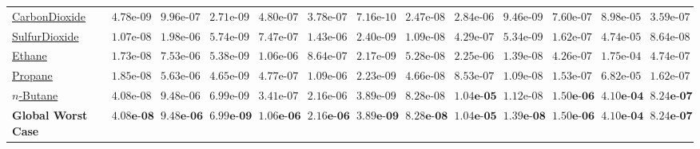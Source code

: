 \documentclass[10pt,a4paper]{article}
\begin{document}
\begin{table}[ht!]
{\begin{tabular}{lrrrrrrrrrrrr}
\href{https://github.com/satwikgupta122/realgas_ml/blob/main/realgas_ml/data/CarbonDioxide_metrics.json}{CarbonDioxide} & $4.78\text{e-}09$ & $9.96\text{e-}07$ & $2.71\text{e-}09$ & $4.80\text{e-}07$ & $3.78\text{e-}07$ & $7.16\text{e-}10$ & $2.47\text{e-}08$ & $2.84\text{e-}06$ & $9.46\text{e-}09$ & $7.60\text{e-}07$ & $8.98\text{e-}05$ & $3.59\text{e-}07$ \\
\href{https://github.com/satwikgupta122/realgas_ml/blob/main/realgas_ml/data/SulfurDioxide_metrics.json}{SulfurDioxide} & $1.07\text{e-}08$ & $1.98\text{e-}06$ & $5.74\text{e-}09$ & $7.47\text{e-}07$ & $1.43\text{e-}06$ & $2.40\text{e-}09$ & $1.09\text{e-}08$ & $4.29\text{e-}07$ & $5.34\text{e-}09$ & $1.62\text{e-}07$ & $4.74\text{e-}05$ & $8.64\text{e-}08$ \\
\href{https://github.com/satwikgupta122/realgas_ml/blob/main/realgas_ml/data/Ethane_metrics.json}{Ethane} & $1.73\text{e-}08$ & $7.53\text{e-}06$ & $5.38\text{e-}09$ & $1.06\text{e-}06$ & $8.64\text{e-}07$ & $2.17\text{e-}09$ & $5.28\text{e-}08$ & $2.25\text{e-}06$ & $1.39\text{e-}08$ & $4.26\text{e-}07$ & $1.75\text{e-}04$ & $4.74\text{e-}07$ \\
\href{https://github.com/satwikgupta122/realgas_ml/blob/main/realgas_ml/data/Propane_metrics.json}{Propane} & $1.85\text{e-}08$ & $5.63\text{e-}06$ & $4.65\text{e-}09$ & $4.77\text{e-}07$ & $1.09\text{e-}06$ & $2.23\text{e-}09$ & $4.66\text{e-}08$ & $8.53\text{e-}07$ & $1.09\text{e-}08$ & $1.53\text{e-}07$ & $6.82\text{e-}05$ & $1.62\text{e-}07$ \\
\href{https://github.com/satwikgupta122/realgas_ml/blob/main/realgas_ml/data/n-Butane_metrics.json}{$n$-Butane} & $4.08\text{e-}08$ & $9.48\text{e-}06$ & $6.99\text{e-}09$ & $3.41\text{e-}07$ & $2.16\text{e-}06$ & $3.89\text{e-}09$ & $8.28\text{e-}08$ & $\mathbf{1.04\text{e-}05}$ & $1.12\text{e-}08$ & $\mathbf{1.50\text{e-}06}$ & $\mathbf{4.10\text{e-}04}$ & $\mathbf{8.24\text{e-}07}$ \\
\midrule
\textbf{Global Worst Case} & $\mathbf{4.08\text{e-}08}$ & $\mathbf{9.48\text{e-}06}$ & $\mathbf{6.99\text{e-}09}$ & $\mathbf{1.06\text{e-}06}$ & $\mathbf{2.16\text{e-}06}$ & $\mathbf{3.89\text{e-}09}$ & $\mathbf{8.28\text{e-}08}$ & $\mathbf{1.04\text{e-}05}$ & $\mathbf{1.39\text{e-}08}$ & $\mathbf{1.50\text{e-}06}$ & $\mathbf{4.10\text{e-}04}$ & $\mathbf{8.24\text{e-}07}$ \\
\bottomrule
\end{tabular}}
\end{table}
\end{document}
